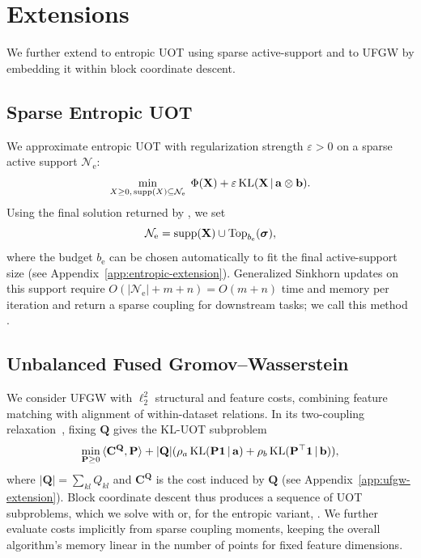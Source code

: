 \section{Extensions}
\label{sec:extensions}

We further extend \ours to entropic UOT using sparse active-support and to UFGW by embedding it within block coordinate descent.

\subsection{Sparse Entropic UOT}
\label{sec:entropic-extension}

We approximate entropic UOT with regularization strength $\varepsilon>0$ on a sparse active support $\mathcal N_{\mathrm e}$:
\begin{equation}
\label{eq:sparse-entropic-extension}
\min_{X\geq0,\,\operatorname{supp}(X)\subseteq\mathcal N_{\mathrm e}}\;\Phi(\mathbf{X})+\varepsilon\operatorname{KL}(\mathbf{X}\,|\,\mathbf{a}\otimes \mathbf{b}).
\end{equation}
Using the final solution returned by \ours, we set
\begin{equation*}
\mathcal N_{\mathrm e}=\operatorname{supp}(\mathbf X)\cup\operatorname{Top}_{b_{\mathrm e}}(\boldsymbol\sigma),
\end{equation*}
where the budget $b_{\mathrm e}$ can be chosen automatically to fit the final active-support size (see Appendix~\ref{app:entropic-extension}).
Generalized Sinkhorn updates on this support require $O(|\mathcal N_{\mathrm e}|+m+n)=O(m+n)$ time and memory per iteration and return a sparse coupling for downstream tasks; we call this method \ourssparsink.

\subsection{Unbalanced Fused Gromov--Wasserstein}
\label{sec:ufgw-extension}

We consider UFGW with $\ell_2^2$ structural and feature costs, combining feature matching with alignment of within-dataset relations.
In its two-coupling relaxation~\citep{sejourne2023unbalanced}, fixing $\mathbf Q$ gives the KL-UOT subproblem
\begin{equation*}
\begin{aligned}
\min_{\mathbf P\geq0}\,
\langle\mathbf C^{\mathbf Q},\mathbf P\rangle
+|\mathbf Q|(\rho_a\operatorname{KL}(\mathbf P\mathbf1\,|\,\mathbf a)
+\rho_b\operatorname{KL}(\mathbf P^\top\mathbf1\,|\,\mathbf b)),
\end{aligned}
\end{equation*}
where $|\mathbf Q|=\sum_{kl}Q_{kl}$ and $\mathbf C^{\mathbf Q}$ is the cost induced by $\mathbf Q$ (see Appendix~\ref{app:ufgw-extension}).
Block coordinate descent thus produces a sequence of UOT subproblems, which we solve with \ours or, for the entropic variant, \ourssparsink.
We further evaluate costs implicitly from sparse coupling moments, keeping the overall algorithm's memory linear in the number of points for fixed feature dimensions.

